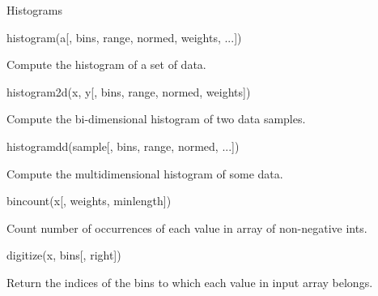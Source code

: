 

Histograms
 





histogram(a[, bins, range, normed, weights, ...])
 
Compute the histogram of a set of data.
 


histogram2d(x, y[, bins, range, normed, weights])
 
Compute the bi-dimensional histogram of two data samples.
 


histogramdd(sample[, bins, range, normed, ...])
 
Compute the multidimensional histogram of some data.
 


bincount(x[, weights, minlength])
 
Count number of occurrences of each value in array of non-negative ints.
 


digitize(x, bins[, right])
 
Return the indices of the bins to which each value in input array belongs.






